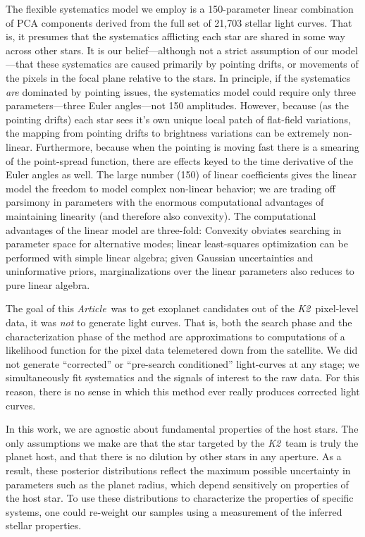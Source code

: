 \documentclass[12pt,preprint]{aastex}
\newcommand{\project}[1]{\textsl{#1}} %
\newcommand{\KT}{\project{K2}}
\newcommand{\paper}{\textsl{Article}}
\begin{document}
The flexible systematics model we employ is a 150-parameter linear combination
of PCA components derived from the full set of 21,703 stellar light curves.
That is, it presumes that the systematics afflicting each star are shared in
some way across other stars.
It is our belief---although not a strict assumption of our model---that these
systematics are caused primarily by pointing drifts, or movements of the
pixels in the focal plane relative to the stars.
In principle, if the systematics \emph{are} dominated by pointing issues, the
systematics model could require only three parameters---three Euler
angles---not 150 amplitudes.
However, because (as the pointing drifts) each star sees it's own unique
local patch of flat-field variations, the mapping from pointing drifts to
brightness variations can be extremely non-linear.
Furthermore, because when the pointing is moving fast there is a smearing of
the point-spread function, there are effects keyed to the time derivative of
the Euler angles as well.
The large number (150) of linear coefficients gives the linear model the
freedom to model complex non-linear behavior; we are trading off parsimony
in parameters with the enormous computational advantages of maintaining
linearity (and therefore also convexity).
The computational advantages of the linear model are three-fold:
Convexity obviates searching in parameter space for alternative modes;
linear least-squares optimization can be performed with simple linear algebra;
given Gaussian uncertainties and uninformative priors, marginalizations over
the linear parameters also reduces to pure linear algebra.

The goal of this \paper\ was to get exoplanet candidates out of the
\KT\ pixel-level data, it was \emph{not} to generate light curves.
That is, both the search phase and the characterization phase of the method
are approximations to computations of a likelihood function for the pixel
data telemetered down from the satellite.
We did not generate ``corrected'' or ``pre-search conditioned'' light-curves
at any stage; we simultaneously fit systematics and the signals of interest
to the raw data.
For this reason, there is no sense in which this method ever really
produces corrected light curves.

In this work, we are agnostic about fundamental properties of the host stars.
The only assumptions we make are that the star targeted by the \KT\
team is truly the planet host, and that there is no dilution by other stars in
any aperture.
As a result, these posterior distributions reflect the maximum possible
uncertainty in parameters such as the planet radius, which depend sensitively
on properties of the host star.
To use these distributions to characterize the properties of specific systems,
one could re-weight our samples using a measurement of the inferred stellar
properties.
\end{document}
